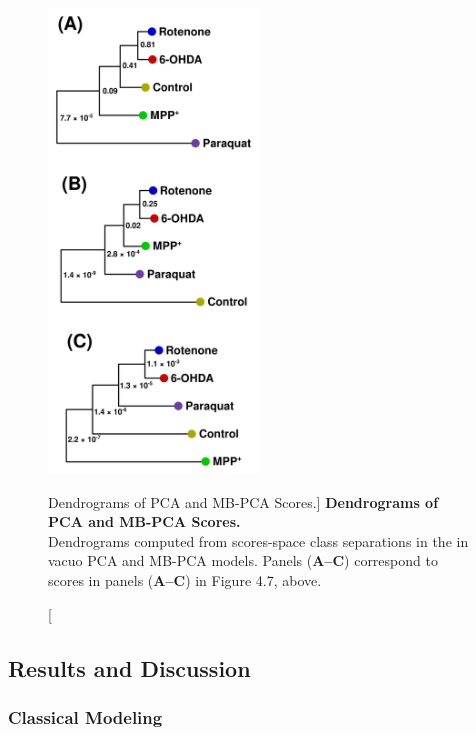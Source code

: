 \begin{figure}
\includegraphics[width=2.2in]{figs/apps/08-mbpca-d.png}
\caption
      [Dendrograms of PCA and MB-PCA Scores.]{
  {\bf Dendrograms of PCA and MB-PCA Scores.}
  \\
  Dendrograms computed from scores-space class separations
  \cite{worley:abio2013} in the in vacuo PCA and MB-PCA models. Panels
  ({\bf A--C}) correspond to scores in panels ({\bf A--C}) in Figure 4.7,
  above.
}
\label{figure.4.8}
\end{figure}

\subsection{Results and Discussion}

\subsubsection{Classical Modeling}

